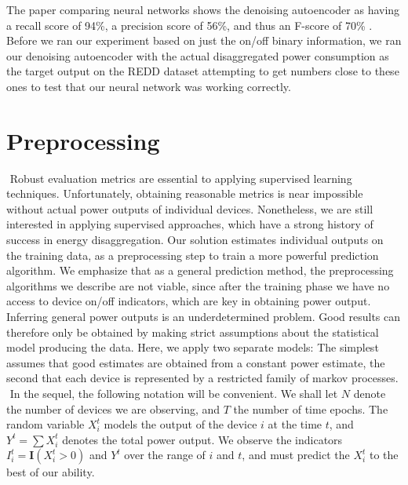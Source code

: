 \documentclass{article}
\begin{document}
The paper comparing neural networks shows the denoising autoencoder as having a recall score of 94\%, a precision score of 56\%, and thus an F-score of 70\% \cite{Kelly}. Before we ran our experiment based on just the on/off binary information, we ran our denoising autoencoder with the actual disaggregated power consumption as the target output on the REDD dataset attempting to get numbers close to these ones to test that our neural network was working correctly.


\section{Preprocessing}
​
Robust evaluation metrics are essential to applying supervised learning techniques. Unfortunately, obtaining reasonable metrics is near impossible without actual power outputs of individual devices. Nonetheless, we are still interested in applying supervised approaches, which have a strong history of success in energy disaggregation. Our solution estimates individual outputs on the training data, as a preprocessing step to train a more powerful prediction algorithm. We emphasize that as a general prediction method, the preprocessing algorithms we describe are not viable, since after the training phase we have no access to device on/off indicators, which are key in obtaining power output.
​
Inferring general power outputs is an underdetermined problem. Good results can therefore only be obtained by making strict assumptions about the statistical model producing the data. Here, we apply two separate models: The simplest assumes that good estimates are obtained from a constant power estimate, the second that each device is represented by a restricted family of markov processes.
​
In the sequel, the following notation will be convenient. We shall let $N$ denote the number of devices we are observing, and $T$ the number of time epochs. The random variable $X_i^t$ models the output of the device $i$ at the time $t$, and $Y^t = \sum X_i^t$ denotes the total power output. We observe the indicators $I_i^t = \mathbf{I}(X_i^t > 0)$ and $Y^t$ over the range of $i$ and $t$, and must predict the $X_i^t$ to the best of our ability.
​
\end{document}
